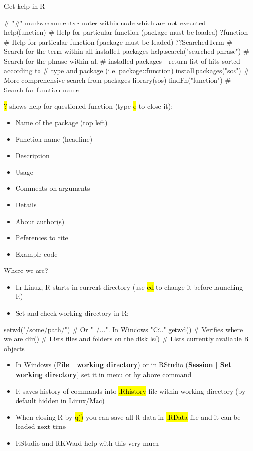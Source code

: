 \documentclass[compress, ucs, xelatex, 11pt, xcolor=svgnames,
  hyperref={
    bookmarks=true,
    unicode=true,
    colorlinks=true,
    pdftitle={Molecular data in R},
    plainpages=false,
    pdfauthor={Vojtech Zeisek},
    pdfsubject={Course about phylogeny and evolution in R},
    pdfcreator={XeLaTeX},
    pdfkeywords={R, evolution, phylogeny, molecular data},
    linkcolor=Tomato,
    anchorcolor=SaddleBrown,
    citecolor=Goldenrod,
    filecolor=DarkMagenta,
    menucolor=Sienna,
    urlcolor=DarkTurquoise,
    pdftex},
  url={hyphens, lowtilde} %
  ]{beamer}
\renewcommand{\texttt}[1]{\hl{\ttfamily #1}}
\begin{document}
\begin{frame}[fragile]{Get help in R}
  \begin{spluscode}
    # "#" marks comments - notes within code which are not executed
    help(function) # Help for particular function (package must be loaded)
    ?function # Help for particular function (package must be loaded)
    ??SearchedTerm # Search for the term within all installed packages
    help.search("searched phrase") # Search for the phrase within all
      # installed packages - return list of hits sorted according to
      # type and package (i.e. package::function)
    install.packages("sos") # More comprehensive search from packages
    library(sos)
    findFn("function") # Search for function name
  \end{spluscode}
\alert{\texttt{?}} shows help for questioned function (type \texttt{q} to close it):
\begin{multicols}{2}
  \begin{itemize}
    \item Name of the package (top left)
    \item Function name (headline)
    \item Description
    \item Usage
    \item Comments on arguments
    \item Details
    \item About author(s)
    \item References to cite
    \item Example code
  \end{itemize}
\end{multicols}
\end{frame}

\begin{frame}[fragile]{Where we are?}
\begin{itemize}
 \item In Linux, R starts in current directory (use \texttt{cd} to change it before launching R)
 \item Set and check working directory in R:
\end{itemize}
  \begin{spluscode}
    setwd("/some/path/") # Or "~/...". In Windows "C:\..."
    getwd() # Verifies where we are
    dir() # Lists files and folders on the disk
    ls() # Lists currently available R objects
  \end{spluscode}
\begin{itemize}
 \item In Windows (\textbf{File | working directory}) or in RStudio (\textbf{Session | Set working directory}) set it in menu or by above command
 \item R saves history of commands into \texttt{.Rhistory} file within working directory (by default hidden in Linux/Mac)
 \item When closing R by \texttt{q()} you can save all R data in \texttt{.RData} file and it can be loaded next time
 \item RStudio and RKWard help with this very much
\end{itemize}
\end{frame}
\end{document}
